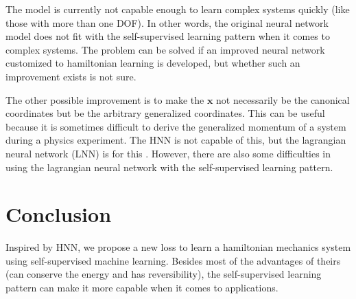 \documentclass{article}
\begin{document}
The model is currently not capable enough to learn complex systems quickly
(like those with more than one DOF).
In other words, the original neural network model does not fit with the self-supervised learning pattern when it comes to complex systems.
The problem can be solved if an improved neural network customized to hamiltonian learning is developed,
but whether such an improvement exists is not sure.

The other possible improvement is to make the $\mathbf x$ not necessarily be the canonical coordinates but be the arbitrary generalized coordinates.
This can be useful because it is sometimes difficult to derive the generalized momentum of a system during a physics experiment.
The HNN is not capable of this, but the lagrangian neural network (LNN) is for this \cite{cranmer2020lagrangian}.
However, there are also some difficulties in using the lagrangian neural network with the self-supervised learning pattern.

\section{Conclusion}

Inspired by HNN, we propose a new loss
to learn a hamiltonian mechanics system using self-supervised machine learning.
Besides most of the advantages of theirs (can conserve the energy and has reversibility),
the self-supervised learning pattern can make it more capable when it comes to applications.



\end{document}
